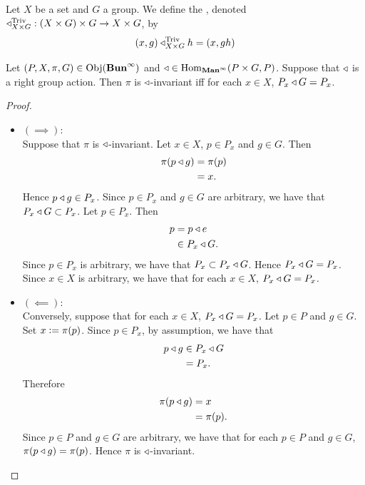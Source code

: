 \documentclass{book}
\begin{document}

\begin{defn}
	Let $X$ be a set and $G$ a group. We define the , denoted $\triangleleft^{\text{Triv}}_{X \times G}: (X \times G) \times G \rightarrow X \times G$, by 
	$$(x,g) \triangleleft^{\text{Triv}}_{X \times G} h = (x, gh)$$
\end{defn}

\begin{ex}
	Let $(P, X, \pi, G) \in \operatorname{Obj}(\operatorname*{\text{\textbf{Bun}}^{\infty}})$ and $\triangleleft \in \operatorname{Hom}_{\operatorname*{\text{\textbf{Man}}^{\infty}}}(P \times G, P)$. Suppose that $\triangleleft$ is a right group action. Then $\pi$ is $\triangleleft$-invariant iff for each $x \in X$, $P_x \triangleleft G = P_x$.
\end{ex}

\begin{proof}\
	\begin{itemize}
		\item $(\implies):$ \\
		Suppose that $\pi$ is $\triangleleft$-invariant. Let $x \in X$, $p \in P_x$ and $g \in G$. Then 
		\begin{align*}
			\pi(p \triangleleft g)
			& = \pi(p) \\
			& = x.
		\end{align*}
		Hence $p \triangleleft g \in P_x$. Since $p \in P_x$ and $g \in G$ are arbitrary, we have that $P_x \triangleleft G \subset P_x$. Let $p \in P_x$. Then 
		\begin{align*}
			p
			& = p \triangleleft e \\
			& \in P_x \triangleleft G.
		\end{align*}
		Since $p \in P_x$ is arbitrary, we have that $P_x \subset P_x \triangleleft G$. Hence $P_x \triangleleft G = P_x$. Since $x \in X$ is arbitrary, we have that for each $x \in X$, $P_x \triangleleft G = P_x$.
		\item $(\impliedby):$ \\
		Conversely, suppose that for each $x \in X$, $P_x \triangleleft G = P_x$. Let $p \in P$ and $g \in G$. Set $x \vcentcolon= \pi(p)$. Since $p \in P_x$, by assumption, we have that
		\begin{align*}
			p \triangleleft g 
			& \in P_x \triangleleft G \\
			& = P_x.
		\end{align*}
		Therefore
		\begin{align*}
			\pi(p \triangleleft g) 
			& = x \\
			& = \pi(p).
		\end{align*}
		Since $p \in P$ and $g \in G$ are arbitrary, we have that for each $p \in P$ and $g \in G$, $\pi(p \triangleleft g) = \pi(p)$. Hence $\pi$ is $\triangleleft$-invariant.
	\end{itemize}
\end{proof}
\end{document}
